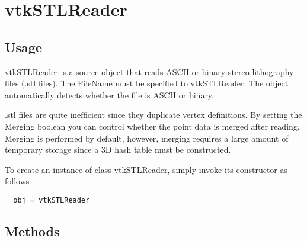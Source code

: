 \section{vtkSTLReader}

\subsection{Usage}

 vtkSTLReader is a source object that reads ASCII or binary stereo 
 lithography files (.stl files). The FileName must be specified to
 vtkSTLReader. The object automatically detects whether the file is
 ASCII or binary.

 .stl files are quite inefficient since they duplicate vertex 
 definitions. By setting the Merging boolean you can control whether the 
 point data is merged after reading. Merging is performed by default, 
 however, merging requires a large amount of temporary storage since a 
 3D hash table must be constructed.

To create an instance of class vtkSTLReader, simply
invoke its constructor as follows
\begin{verbatim}
  obj = vtkSTLReader
\end{verbatim}
\subsection{Methods}

